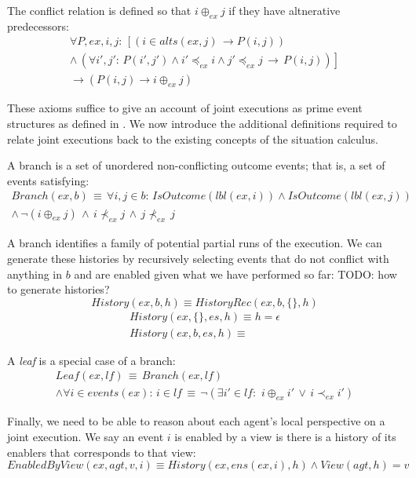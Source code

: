The conflict relation is defined so that $i\oplus_{ex}j$ if they
have altnerative predecessors:\begin{multline*}
\forall P,ex,i,j:\,\left[\left(i\in alts(ex,j)\,\rightarrow P(i,j)\right)\right.\\
\left.\wedge\,\left(\forall i',j':\, P(i',j')\wedge i'\preceq_{ex}i\wedge j'\preceq_{ex}j\,\rightarrow\, P(i,j)\right)\right]\\
\rightarrow\left(P(i,j)\rightarrow i\oplus_{ex}j\right)\end{multline*}


These axioms suffice to give an account of joint executions as prime
event structures as defined in \citep{npw79event_structures}. We
now introduce the additional definitions required to relate joint
executions back to the existing concepts of the situation calculus.

A branch is a set of unordered non-conflicting outcome events; that
is, a set of events satisfying:\begin{multline*}
Branch(ex,b)\,\equiv\,\forall i,j\in b:\, IsOutcome(lbl(ex,i))\wedge IsOutcome(lbl(ex,j))\\
\wedge\,\neg(i\oplus_{ex}j)\,\wedge\, i\not\prec_{ex}j\,\wedge\, j\not\prec_{ex}\, j\end{multline*}


A branch identifies a family of potential partial runs of the execution.
We can generate these histories by recursively selecting events that
do not conflict with anything in $b$ and are enabled given what we
have performed so far: TODO: how to generate histories?\[
History(ex,b,h)\equiv HistoryRec(ex,b,\{\},h)\]
\begin{gather*}
History(ex,\{\},es,h)\equiv h=\epsilon\\
History(ex,b,es,h)\equiv\end{gather*}


A \emph{leaf} is a special case of a branch:\begin{multline*}
Leaf(ex,lf)\,\equiv\, Branch(ex,lf)\\
\wedge\forall i\in events(ex):\, i\in lf\,\equiv\,\neg(\exists i'\in lf:\,\, i\oplus_{ex}i'\,\vee\, i\prec_{ex}i')\end{multline*}


Finally, we need to be able to reason about each agent's local perspective
on a joint execution. We say an event $i$ is enabled by a view is
there is a history of its enablers that corresponds to that view:
\[
EnabledByView(ex,agt,v,i)\equiv History(ex,ens(ex,i),h)\wedge View(agt,h)=v\]



